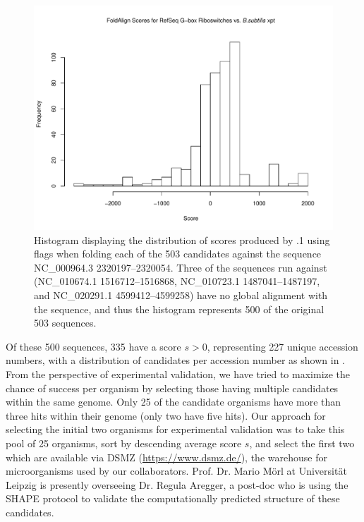 \begin{figure}[!ht]
\centering
\includegraphics[width=.9\textwidth]{Figures/Ribofinder/histogramFoldalignCandidatesVsXpt.pdf}
\caption[Histogram displaying the distribution of scores produced by \foldalign]{Histogram displaying the distribution of scores produced by .1 using flags  when folding each of
the 503 candidates against the \Bsxpt sequence NC\_000964.3 2320197--2320054.
Three of the sequences run against \foldalign (NC\_010674.1 1516712--1516868,
NC\_010723.1 1487041--1487197, and NC\_020291.1 4599412--4599258) have no global
alignment with the \Bsxpt sequence, and thus the histogram represents 500 of the
original 503 sequences.}
\label{fig:rfinder:histogramFoldalignCandidatesVsXpt}
\end{figure}

Of these 500 sequences, 335 have a \foldalign score $s > 0$, representing 227
unique accession numbers, with a distribution of candidates per accession number
as shown in . From
the perspective of experimental validation, we have tried to maximize the chance
of success per organism by selecting those having multiple candidates within the
same genome. Only 25 of the candidate organisms have more than three hits within
their genome (only two have five hits). Our approach for selecting the initial
two organisms for experimental validation was to take this pool of 25 organisms,
sort by descending average score $s$, and select the first two which are available
via DSMZ (\url{https://www.dsmz.de/}), the warehouse for microorganisms used by
our collaborators. Prof. Dr. Mario M\"orl at Universit\"at Leipzig is presently
overseeing Dr. Regula Aregger, a post-doc who is using the SHAPE protocol
\citep{wilkinson:2006vd} to
validate the computationally predicted structure of these candidates.


